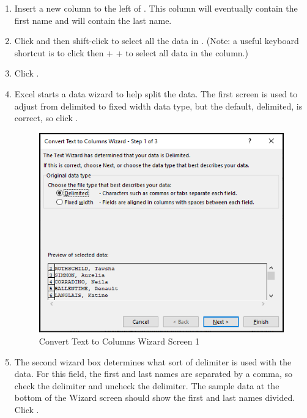 \begin{enumerate}
	\item Insert a new column to the left of . This column will eventually contain the first name and  will contain the last name.
	\item Click  and then shift-click  to select all the data in . (Note: a useful keyboard shortcut is to click  then  +  +  to select all data in the column.)
	\item Click .
	\item Excel starts a data wizard to help split the data. The first screen is used to adjust from delimited to fixed width data type, but the default, delimited, is correct, so click .
	
	\begin{figure}[H]
		\centering
		\includegraphics[width=\maxwidth{.75\linewidth}]{gfx/ch09_fig30}
		\caption{Convert Text to Columns Wizard Screen 1}
		\label{09:fig30}
	\end{figure}

	\item The second wizard box determines what sort of delimiter is used with the data. For this field, the first and last names are separated by a comma, so check the  delimiter and uncheck the  delimiter. The sample data at the bottom of the Wizard screen should show the first and last names divided. Click .


\end{enumerate}
